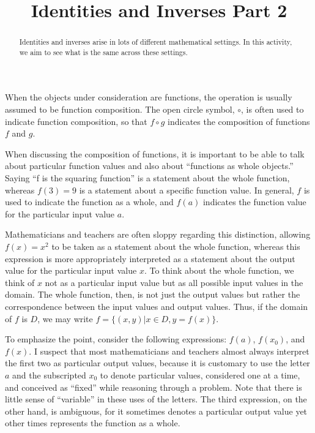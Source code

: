 \documentclass{ximera}
\title{Identities and Inverses Part 2}
\begin{document}
\begin{abstract}
Identities and inverses arise in lots of different mathematical settings.  In this activity, we aim to see what is the same across these settings.  
\end{abstract}
\maketitle


%
%

When the objects under consideration are functions, the operation is usually assumed to be function composition.  The open circle symbol, $\circ$, is often used to indicate function composition, so that $f\circ g$  indicates the composition of functions $f$ and $g$.  

When discussing the composition of functions, it is important to be able to talk about particular function values and also about ``functions as whole objects.''  Saying ``f is the squaring function'' is a statement about the whole function, whereas $f(3) = 9$ is a statement about a specific function value.  In general, $f$ is used to indicate the function as a whole, and $f(a)$ indicates the function value for the particular input value $a$.  

Mathematicians and teachers are often sloppy regarding this distinction, allowing $f(x)=x^2$ to be taken as a statement about the whole function, whereas this expression is more appropriately interpreted as a statement about the output value for the particular input value $x$.  To think about the whole function, we think of $x$ not as a particular input value but as all possible input values in the domain.  The whole function, then, is not just the output values but rather the correspondence between the input values and output values.  Thus, if the domain of $f$ is $D$, we may write $f=\{(x,y) | x\in D, y=f(x)\}$.
  
To emphasize the point, consider the following expressions:  $f(a)$, $f(x_0)$, and $f(x)$.  I suspect that most mathematicians and teachers almost always interpret the first two as particular output values, because it is customary to use the letter $a$ and the subscripted $x_0$ to denote particular values, considered one at a time, and conceived as ``fixed'' while reasoning through a problem.  Note that there is little sense of ``variable'' in these uses of the letters.  The third expression, on the other hand, is ambiguous, for it sometimes denotes a particular output value yet other times represents the function as a whole.  
\end{document}
